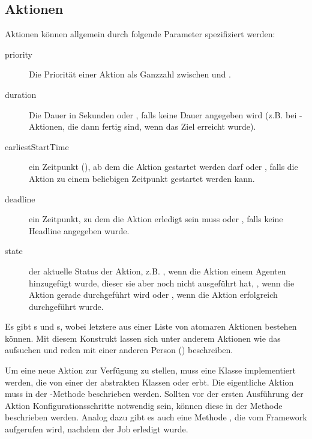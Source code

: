 \subsection{Aktionen}\label{subsec:concept_actions}
Aktionen können allgemein durch folgende Parameter spezifiziert werden:
\begin{description}
	\item[priority] Die Priorität einer Aktion als Ganzzahl zwischen  und .
	\item[duration] Die Dauer in Sekunden oder , falls keine Dauer angegeben wird (z.B. bei -Aktionen, die dann fertig sind, wenn das Ziel erreicht wurde).
	\item[earliestStartTime] ein Zeitpunkt (), ab dem die Aktion gestartet werden darf oder , falls die Aktion zu einem beliebigen Zeitpunkt gestartet werden kann.
	\item[deadline] ein Zeitpunkt, zu dem die Aktion erledigt sein muss oder , falls keine Headline angegeben wurde.
	\item[state] der aktuelle Status der Aktion, z.B. , wenn die Aktion einem Agenten hinzugefügt wurde, dieser sie aber noch nicht ausgeführt hat, , wenn die Aktion gerade durchgeführt wird oder , wenn die Aktion erfolgreich durchgeführt wurde.
\end{description}
Es gibt s und s, wobei letztere aus einer Liste von atomaren Aktionen bestehen können. Mit diesem Konstrukt lassen sich unter anderem Aktionen wie das aufsuchen und reden mit einer anderen Person () beschreiben.

Um eine neue Aktion zur Verfügung zu stellen, muss eine Klasse implementiert werden, die von einer der abstrakten Klassen  oder  erbt. Die eigentliche Aktion muss in der -Methode beschrieben werden. Sollten vor der ersten Ausführung der Aktion Konfigurationsschritte notwendig sein, können diese in der Methode  beschrieben werden. Analog dazu gibt es auch eine Methode , die vom Framework aufgerufen wird, nachdem der Job erledigt wurde.

